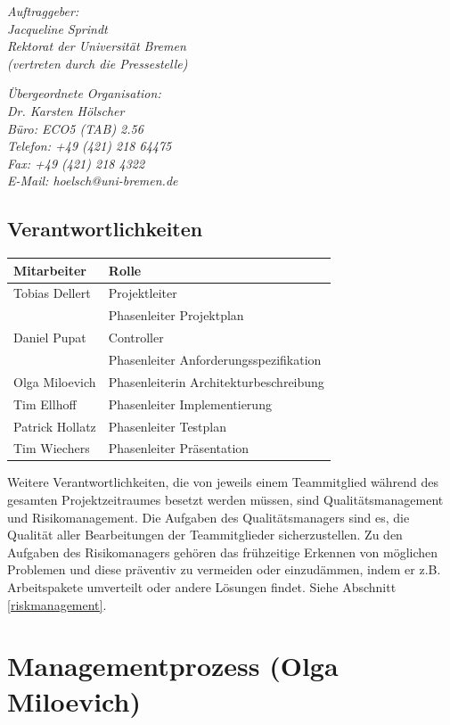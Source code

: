 \documentclass[fontsize=12pt,paper=a4,twoside]{scrartcl}
\begin{document}
{\em Auftraggeber:\\
	Jacqueline Sprindt\\
	Rektorat der Universität Bremen\\
	(vertreten durch die Pressestelle)\\
}

{\em Übergeordnete Organisation:\\ 
	Dr. Karsten Hölscher\\
	Büro: ECO5 (TAB) 2.56\\
    Telefon: +49 (421) 218 64475 \\
    Fax: +49 (421) 218 4322 \\
	E-Mail: hoelsch@uni-bremen.de 
}



\subsection{Verantwortlichkeiten}
\begin{tabular}{|l|l|}
\textbf{Mitarbeiter} & \textbf{Rolle} \\
\hline
Tobias Dellert & Projektleiter \\
 & Phasenleiter Projektplan \\
\hline
Daniel Pupat & Controller \\
& Phasenleiter  Anforderungsspezifikation \\ 
\hline
Olga Miloevich & Phasenleiterin Architekturbeschreibung \\
\hline
Tim Ellhoff & Phasenleiter Implementierung \\
\hline
Patrick Hollatz & Phasenleiter Testplan \\
\hline
Tim Wiechers & Phasenleiter Präsentation
\end{tabular}

Weitere Verantwortlichkeiten, die von jeweils einem Teammitglied während des gesamten Projektzeitraumes besetzt werden müssen, sind Qualitätsmanagement und Risikomanagement.
Die Aufgaben des Qualitätsmanagers sind es, die Qualität aller Bearbeitungen der Teammitglieder sicherzustellen.
Zu den Aufgaben des Risikomanagers gehören das frühzeitige Erkennen von möglichen Problemen und diese präventiv zu vermeiden oder einzudämmen, indem er z.B. Arbeitspakete umverteilt oder andere Lösungen findet. Siehe Abschnitt \ref{riskmanagement}.


\section{Managementprozess (Olga Miloevich)}
\end{document}
